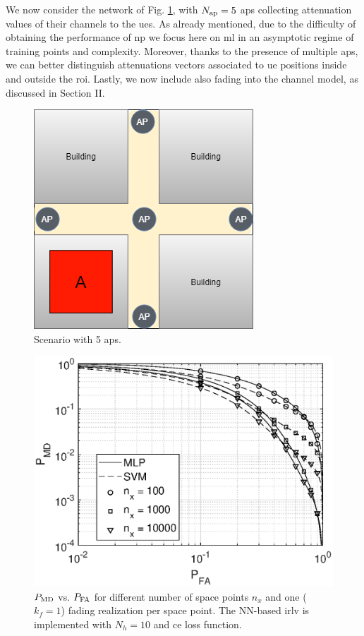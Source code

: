 \documentclass[draftcls,onecolumn,12pt]{IEEEtran}
\begin{document}
We now consider the network of Fig. \ref{fig:mBS}, with $N_{\rm ap}=5$ \acp{ap} collecting attenuation values of their channels to the \acp{ue}. As already mentioned, due to the difficulty of obtaining the performance of \ac{np} we focus here on \ac{ml} in an asymptotic regime of training points and complexity. Moreover, thanks to the presence of multiple \acp{ap}, we can better distinguish attenuations vectors associated to \ac{ue} positions inside and outside the \ac{roi}. Lastly, we now include also fading into the channel model, as discussed in Section II.

\begin{figure}[t]
    \centering
    \includegraphics[width=0.5\columnwidth]{scenario2.png}
    \caption{Scenario with 5 \acp{ap}.} 
    \label{fig:mBS}
\end{figure}
\begin{figure}[t]
    \centering
    \includegraphics[width=0.6\columnwidth]{res_avg_nTrain_kf1.eps}
    \caption{$P_{\rm MD}$ vs. $P_{\rm FA}$ for different number of space points $n_x$ and one ($k_f=1$) fading realization per space point. The NN-based \ac{irlv} is implemented with $N_h = 10$ and \ac{ce} loss function.}
    \label{fig:kf1}
\end{figure}
\end{document}
